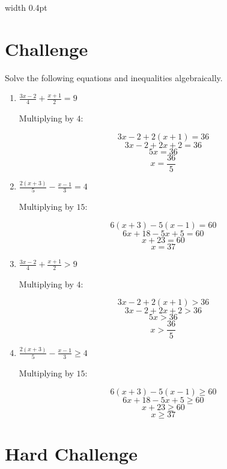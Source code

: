 	\hfill
	\vrule width 0.4pt
	\hfill
	\begin{minipage}[t]{0.35\textwidth}
		
		\section{Challenge}
		
		Solve the following equations and inequalities algebraically.
		
		\begin{enumerate}
			\item
			$\frac{3x-2}{4}+\frac{x+1}{2}=9$
			
			Multiplying by $4$:
			
			\[
			3x-2+2(x+1)=36
			\]
			\[
			3x-2+2x+2=36
			\]
			\[
			5x=36
			\]
			\[
			x=\frac{36}{5}
			\]
			
			\item
			$\frac{2(x+3)}{5}-\frac{x-1}{3}=4$
			
			Multiplying by $15$:
			
			\[
			6(x+3)-5(x-1)=60
			\]
			\[
			6x+18-5x+5=60
			\]
			\[
			x+23=60
			\]
			\[
			x=37
			\]
			
			\item
			$\frac{3x-2}{4}+\frac{x+1}{2}>9$
			
			Multiplying by $4$:
			
			\[
			3x-2+2(x+1)>36
			\]
			\[
			3x-2+2x+2>36
			\]
			\[
			5x>36
			\]
			\[
			x>\frac{36}{5}
			\]
			
			\item
			$\frac{2(x+3)}{5}-\frac{x-1}{3}\geq4$
			
			Multiplying by $15$:
			
			\[
			6(x+3)-5(x-1)\geq60
			\]
			\[
			6x+18-5x+5\geq60
			\]
			\[
			x+23\geq60
			\]
			\[
			x\geq37
			\]
		\end{enumerate}
		
	\end{minipage}
	
	\newpage
	\section{Hard Challenge}

